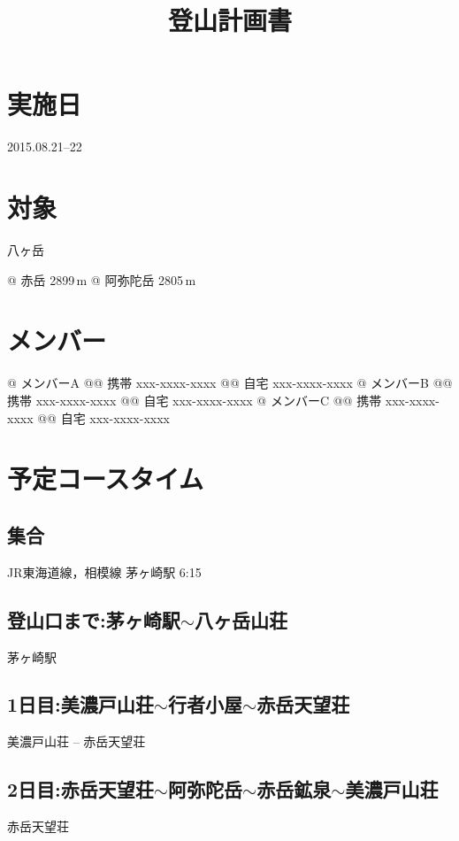 \documentclass[a4paper,twocolumn,landscape]{jsarticle}
\title{登山計画書}
\date{}
\author{}
\begin{document}
\maketitle

\section{実施日}
2015.08.21--22

\section{対象}
八ヶ岳
\begin{easylist}[itemize]
@ 赤岳 2899\,m
@ 阿弥陀岳 2805\,m
\end{easylist}

\section{メンバー}
\begin{easylist}[itemize]
@ メンバーA
@@ 携帯 xxx-xxxx-xxxx
@@ 自宅 xxx-xxxx-xxxx
@ メンバーB
@@ 携帯 xxx-xxxx-xxxx
@@ 自宅 xxx-xxxx-xxxx
@ メンバーC
@@ 携帯 xxx-xxxx-xxxx
@@ 自宅 xxx-xxxx-xxxx
\end{easylist}

\newpage
\section{予定コースタイム}
\subsection*{集合}
JR東海道線，相模線 茅ヶ崎駅 6:15

\subsection*{登山口まで:茅ヶ崎駅$\sim$八ヶ岳山荘}
茅ヶ崎駅

\subsection*{1日目:美濃戸山荘$\sim$行者小屋$\sim$赤岳天望荘}
美濃戸山荘
--
赤岳天望荘

\subsection*{2日目:赤岳天望荘$\sim$阿弥陀岳$\sim$赤岳鉱泉$\sim$美濃戸山荘}
赤岳天望荘 
\end{document}

